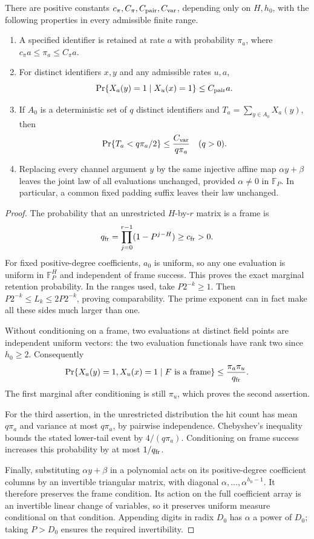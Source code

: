 \begin{lemma}\label{lem:env-ranks}
There are positive constants $c_\pi,C_\pi,C_{\rm pair},C_{\rm var}$,
depending only on $H,h_0$, with the following properties in every
admissible finite range.
\begin{enumerate}
\item A specified identifier is retained at rate $a$ with probability
$\pi_a$, where $c_\pi a\le\pi_a\le C_\pi a$.
\item For distinct identifiers $x,y$ and any admissible rates $u,a$,
\[
\Pr\{X_a(y)=1\mid X_u(x)=1\}\le C_{\rm pair}a.
\]
\item If $A_0$ is a deterministic set of $q$ distinct identifiers and
$T_a=\sum_{y\in A_0}X_a(y)$, then
\[
\Pr\{T_a<q\pi_a/2\}\le \frac{C_{\rm var}}{q\pi_a}
\quad(q>0).
\]
\item Replacing every channel argument $y$ by the same injective affine
map $\alpha y+\beta$ leaves the joint law of all evaluations unchanged,
provided $\alpha\ne0$ in $\mathbb F_P$. In particular, a common fixed
padding suffix leaves their law unchanged.
\end{enumerate}
\end{lemma}

\begin{proof}
The probability that an unrestricted $H$-by-$r$ matrix is a frame is
\[
q_{\rm fr}=\prod_{j=0}^{r-1}(1-P^{j-H})\ge c_{\rm fr}>0.
\]
For fixed positive-degree coefficients, $a_0$ is uniform, so any one
evaluation is uniform in $\mathbb F_P^H$ and independent of frame
success. This proves the exact marginal retention probability.
In the ranges used, take $P2^{-k}\ge1$. Then
$P2^{-k}\le L_k\le2P2^{-k}$, proving comparability. The prime
exponent can in fact make all these sides much larger than one.

Without conditioning on a frame, two evaluations at distinct field
points are independent uniform vectors: the two evaluation functionals
have rank two since $h_0\ge2$. Consequently
\[
\Pr\{X_a(y)=1,X_u(x)=1\mid F\text{ is a frame}\}
\le \frac{\pi_a\pi_u}{q_{\rm fr}}.
\]
The first marginal after conditioning is still $\pi_u$, which proves
the second assertion.

For the third assertion, in the unrestricted distribution the hit count
has mean $q\pi_a$ and variance at most $q\pi_a$, by pairwise
independence. Chebyshev's inequality bounds the stated lower-tail event
by $4/(q\pi_a)$. Conditioning on frame success increases this probability
by at most $1/q_{\rm fr}$.

Finally, substituting $\alpha y+\beta$ in a polynomial acts on its
positive-degree coefficient columns by an invertible triangular
matrix, with diagonal $\alpha,\ldots,\alpha^{h_0-1}$.
It therefore preserves the frame condition. Its action on the full
coefficient array is an invertible linear change of variables, so it
preserves uniform measure conditional on that condition. Appending
digits in radix $D_0$ has $\alpha$ a power of $D_0$; taking
$P>D_0$ ensures the required invertibility.
\end{proof}
